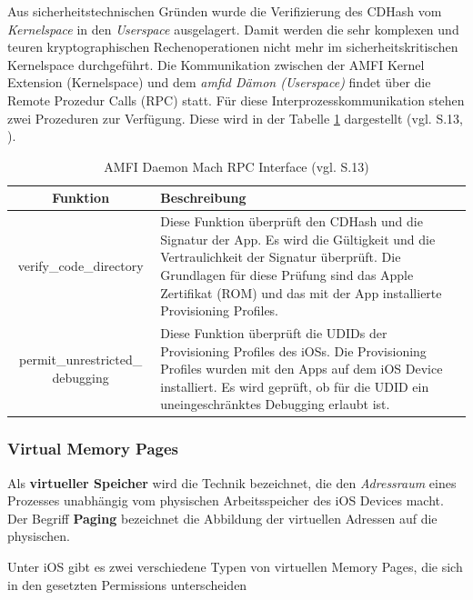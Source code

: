  Aus sicherheitstechnischen Gründen wurde die Verifizierung des CDHash vom \textit{\glqq Kernelspace\grqq{}} in den \textit{\glqq Userspace\grqq{}} ausgelagert. Damit werden die sehr komplexen und teuren kryptographischen Rechenoperationen nicht mehr im sicherheitskritischen Kernelspace durchgeführt. Die Kommunikation zwischen der AMFI Kernel Extension (Kernelspace) und dem \textit{\glqq amfid Dämon (Userspace)\grqq{}} findet über die Remote Prozedur Calls (RPC) statt. Für diese Interprozesskommunikation stehen zwei Prozeduren zur Verfügung. Diese wird in der Tabelle \ref{tab:AMFID} dargestellt (vgl. \cite{iOSSec[5]} S.13, \cite{Mach[1]}).

\begin{table}[ht]
\begin{center}
\begin{tabular}{|c|p{}|} \hline
  Funktion & Beschreibung\\ \hline
verify\_code\_directory &  
Diese Funktion überprüft den CDHash und die Signatur der App. Es wird die Gültigkeit und die Vertraulichkeit der Signatur überprüft. Die Grundlagen für diese Prüfung sind das Apple Zertifikat (ROM) und das mit der App installierte Provisioning Profiles.\\ \hline

permit\_unrestricted\_ debugging &  
Diese Funktion überprüft die UDIDs der Provisioning Profiles des iOSs. Die Provisioning Profiles wurden mit den Apps auf dem iOS Device installiert. Es wird geprüft, ob für die UDID ein uneingeschränktes Debugging erlaubt ist. \\ \hline
\end{tabular} 
\caption{AMFI Daemon Mach RPC Interface (vgl. \cite{iOSSec[5]} S.13)}
\label{tab:AMFID}
\end{center}
\end{table}

\subsubsection{Virtual Memory Pages}
\label{sec:virMemoryPages}
 Als \textbf{virtueller Speicher} wird die Technik bezeichnet, die den \textit{\glqq Adressraum\grqq{}} eines Prozesses unabhängig vom physischen Arbeitsspeicher des iOS Devices macht. Der Begriff \textbf{Paging} bezeichnet die Abbildung der virtuellen Adressen auf die physischen.\par 
Unter iOS gibt es zwei verschiedene Typen von virtuellen Memory Pages, die sich in den gesetzten Permissions unterscheiden 


